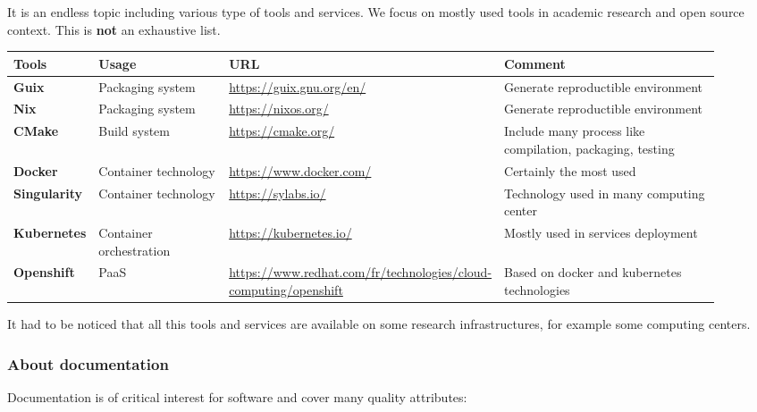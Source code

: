 It is an endless topic including various type of tools and
services. We focus on mostly used tools in academic research and open
source context. This is {\bf not} an exhaustive list.

\begin{center}
  \label{tab:tools_pack}
  \small
  \begin{tabular}{|p{0.12\linewidth}|p{0.2\linewidth}|p{0.25\linewidth}|p{0.35\linewidth}|} \hline

    \textbf{Tools} & \textbf{Usage} & \textbf{URL} & \textbf{Comment} \\ \hline \hline
    \textbf{Guix} & Packaging system & \url{https://guix.gnu.org/en/}
    & Generate reproductible environment \\ \hline
    \textbf{Nix} & Packaging system & \url{https://nixos.org/}
    & Generate reproductible environment \\ \hline
    \textbf{CMake} & Build system & \url{https://cmake.org/}
    & Include many process like compilation, packaging, testing  \\ \hline
    \textbf{Docker} & Container technology & \url{https://www.docker.com/}
    &  Certainly the most used \\ \hline
    \textbf{Singularity} & Container technology & \url{https://sylabs.io/}
    & Technology used in many computing center  \\ \hline
    \textbf{Kubernetes} & Container orchestration & \url{https://kubernetes.io/}
    & Mostly used in services deployment  \\ \hline
    \textbf{Openshift} & PaaS & \url{https://www.redhat.com/fr/technologies/cloud-computing/openshift}
    & Based on docker and kubernetes technologies  \\ \hline

  \end{tabular}
\end{center}

It had to be noticed that all this tools and services are available on
some research infrastructures, for example some computing centers.

\subsubsection{About documentation}

Documentation is of critical interest for software and cover many
quality attributes: 

